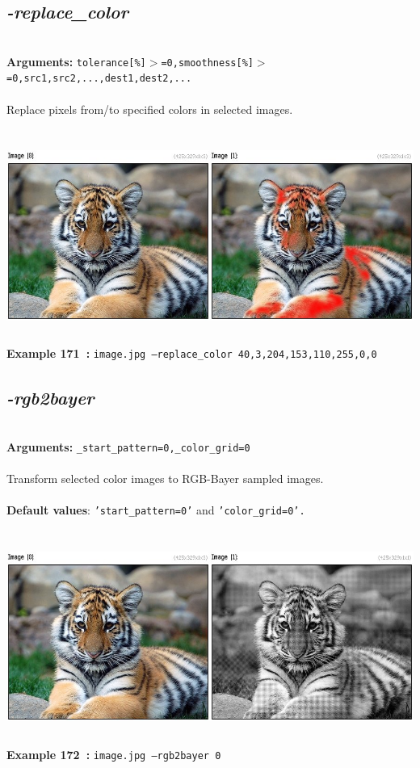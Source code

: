 \documentclass[a4paper,11pt,twoside]{book}
\begin{document}
\subsection{\emph{-replace\_color} }\vspace*{-0.5em}
~\\\textbf{Arguments: } 
{\small \texttt{tolerance[\%]$>$=0,smoothness[\%]$>$=0,src1,src2,...,dest1,dest2,...}}\\~\\
Replace pixels from/to specified colors in selected images.
\begin{center}\includegraphics[keepaspectratio=true,height=7cm,width=\textwidth]{img/gmic_def171.jpg}\\
{\footnotesize \textbf{Example 171~:} \texttt{image.jpg --replace\_color 40,3,204,153,110,255,0,0}}
\end{center}

\subsection{\emph{-rgb2bayer} }\vspace*{-0.5em}
~\\\textbf{Arguments: } 
{\small \texttt{\_start\_pattern=0,\_color\_grid=0}}\\~\\
Transform selected color images to RGB-Bayer sampled images.
~\\~\\\textbf{Default values}: {\small \texttt{'start\_pattern=0'} and \texttt{'color\_grid=0'.}}
\begin{center}\includegraphics[keepaspectratio=true,height=7cm,width=\textwidth]{img/gmic_def172.jpg}\\
{\footnotesize \textbf{Example 172~:} \texttt{image.jpg --rgb2bayer 0}}
\end{center}
\end{document}
